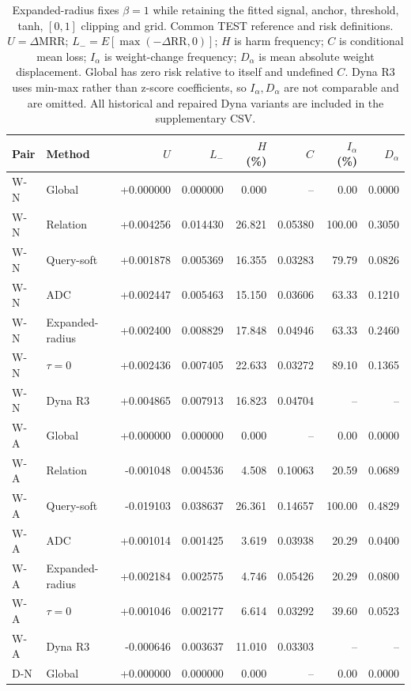 \begin{table}[htbp]
\centering\footnotesize
\setlength{\tabcolsep}{3.5pt}
\caption{Expanded-radius fixes $\beta=1$ while retaining the fitted signal, anchor, threshold, tanh, $[0,1]$ clipping and grid. Common TEST reference and risk definitions. $U=\Delta\mathrm{MRR}$; $L_-=E[\max(-\Delta\mathrm{RR},0)]$; $H$ is harm frequency; $C$ is conditional mean loss; $I_\alpha$ is weight-change frequency; $D_\alpha$ is mean absolute weight displacement. Global has zero risk relative to itself and undefined $C$. Dyna R3 uses min-max rather than z-score coefficients, so $I_\alpha,D_\alpha$ are not comparable and are omitted. All historical and repaired Dyna variants are included in the supplementary CSV.}
\label{tab:conservative-fair}
\begin{tabular}{llrrrrrr}
\toprule
Pair & Method & $U$ & $L_-$ & $H$ (\%) & $C$ & $I_\alpha$ (\%) & $D_\alpha$\\
\midrule
W-N & Global & +0.000000 & 0.000000 & 0.000 & -- & 0.00 & 0.0000\\
W-N & Relation & +0.004256 & 0.014430 & 26.821 & 0.05380 & 100.00 & 0.3050\\
W-N & Query-soft & +0.001878 & 0.005369 & 16.355 & 0.03283 & 79.79 & 0.0826\\
W-N & ADC & +0.002447 & 0.005463 & 15.150 & 0.03606 & 63.33 & 0.1210\\
W-N & Expanded-radius & +0.002400 & 0.008829 & 17.848 & 0.04946 & 63.33 & 0.2460\\
W-N & $\tau=0$ & +0.002436 & 0.007405 & 22.633 & 0.03272 & 89.10 & 0.1365\\
W-N & Dyna R3 & +0.004865 & 0.007913 & 16.823 & 0.04704 & -- & --\\
\midrule
W-A & Global & +0.000000 & 0.000000 & 0.000 & -- & 0.00 & 0.0000\\
W-A & Relation & -0.001048 & 0.004536 & 4.508 & 0.10063 & 20.59 & 0.0689\\
W-A & Query-soft & -0.019103 & 0.038637 & 26.361 & 0.14657 & 100.00 & 0.4829\\
W-A & ADC & +0.001014 & 0.001425 & 3.619 & 0.03938 & 20.29 & 0.0400\\
W-A & Expanded-radius & +0.002184 & 0.002575 & 4.746 & 0.05426 & 20.29 & 0.0800\\
W-A & $\tau=0$ & +0.001046 & 0.002177 & 6.614 & 0.03292 & 39.60 & 0.0523\\
W-A & Dyna R3 & -0.000646 & 0.003637 & 11.010 & 0.03303 & -- & --\\
\midrule
D-N & Global & +0.000000 & 0.000000 & 0.000 & -- & 0.00 & 0.0000\\

\end{tabular}
\end{table}
